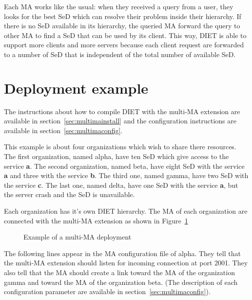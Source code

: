Each MA works like the usual: when they received a query from a user, they
looks for the best SeD which can resolve their problem inside their
hierarchy. If there is no SeD available in its hierarchy, the queried MA forward
the query to other MA to find a SeD that can be used by its client.  This
way, DIET is able to support more clients and more servers because each client
request are forwarded to a number of SeD that is independent of the total
number of available SeD.

\section{Deployment example}

The instructions about how to compile DIET with the multi-MA extension are
available in section~\ref{sec:multimainstall} and the configuration
instructions are available in section~\ref{sec:multimaconfig}.

This example is about four organizations which wish to share there
resources. The first organization, named alpha, have ten SeD which give access
to the service \textbf{a}. The second organization, named beta, have eight SeD
with the service \textbf{a} and three with the service \textbf{b}. The third
one, named gamma, have two SeD with the service \textbf{c}.  The last one,
named delta, have one SeD with the service \textbf{a}, but the server crash and
the SeD is unavailable.

Each organization has it's own DIET hierarchy. The MA of each organization are
connected with the multi-MA extension as shown in Figure~\ref{fig:multima}


\begin{figure}[h]
 \begin{center}
   \label{fig:multima}
  \caption{Example of a multi-MA deployment}
 \end{center}
\end{figure}

The following lines appear in the MA configuration file of alpha. They tell
that the multi-MA extension should listen for incoming connection at port
2001. They also tell that the MA should create a link toward the MA of the
organization gamma and toward the MA of the organization beta. (The description
of each configuration parameter are available in
section~\ref{sec:multimaconfig}).

